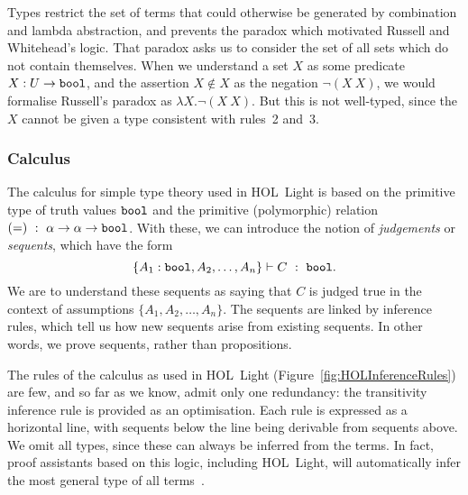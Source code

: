 Types restrict the set of terms that could otherwise be generated by combination and lambda abstraction, and prevents the paradox which motivated Russell and Whitehead's logic. That paradox asks us to consider the set of all sets which do not contain themselves. When we understand a set $X$ as some predicate $X:U \rightarrow \texttt{bool}$, and the assertion $X \not\in X$ as the negation $\neg(X\ X)$, we would formalise Russell's paradox as $\lambda X. \neg(X\ X)$. But this is not well-typed, since the $X$ cannot be given a type consistent with rules~2 and~3.

\subsubsection{Calculus}\label{sec:HOLInferenceRules}
The calculus for simple type theory used in HOL~Light is based on the primitive type of truth values $\texttt{bool}$ and the primitive (polymorphic) relation $(=)\ :\ \alpha \rightarrow \alpha \rightarrow \texttt{bool}$. With these, we can introduce the notion of \emph{judgements} or \emph{sequents}, which have the form
\begin{displaymath}
\{A_1:\code{bool},A_2,\ldots,A_n\} \vdash C\ :\ \code{bool}.
\end{displaymath}
We are to understand these sequents as saying that $C$ is judged true in the context of assumptions $\{A_1,A_2,\ldots,A_n\}$. The sequents are linked by inference rules, which tell us how new sequents arise from existing sequents. In other words, we prove sequents, rather than propositions.

The rules of the calculus as used in HOL~Light (Figure~\ref{fig:HOLInferenceRules}) are few, and so far as we know, admit only one redundancy: the transitivity inference rule is provided as an optimisation. Each rule is expressed as a horizontal line, with sequents below the line being derivable from sequents above. We omit all types, since these can always be inferred from the terms. In fact, proof assistants based on this logic, including HOL~Light, will automatically infer the most general type of all terms~\cite{HindleyMilner}.


